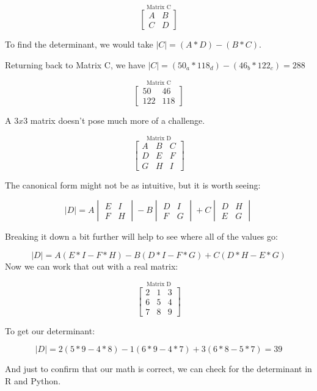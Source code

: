 \documentclass[
  letterpaper,
]{krantz}
\begin{document}
\[
\stackrel{\mbox{Matrix C}}{
\begin{bmatrix}
A & B\\
C & D
\end{bmatrix}
}
\]

To find the determinant, we would take \(\mid C \mid = (A*D) - (B*C)\).

Returning back to Matrix C, we have
\(\mid C \mid = (50_a*118_d) - (46_b*122_c) = 288\)

\[
\stackrel{\mbox{Matrix C}}{
\begin{bmatrix}
50 & 46\\
122 & 118
\end{bmatrix}
}
\]

A \(3x3\) matrix doesn't pose much more of a challenge.

\[
\stackrel{\mbox{Matrix D}}{
\begin{bmatrix}
A & B & C\\
D & E & F\\
G & H & I
\end{bmatrix}
}
\]

The canonical form might not be as intuitive, but it is worth seeing:

\[
\mid D \mid = A\begin{vmatrix}
E & I\\
F & H
\end{vmatrix}  - 
B\begin{vmatrix}
D & I\\
F & G
\end{vmatrix} + 
C\begin{vmatrix}
D & H\\
E & G
\end{vmatrix}
\]

Breaking it down a bit further will help to see where all of the values
go:

\[
\mid D \mid = A(E*I - F*H) - B(D*I - F*G) + C(D*H - E*G)
\] Now we can work that out with a real matrix:

\[
\stackrel{\mbox{Matrix D}}{
\begin{bmatrix}
2 & 1 & 3\\
6 & 5 & 4\\
7 & 8 & 9
\end{bmatrix}
}
\]

To get our determinant:

\[
\mid D \mid = 2(5*9 - 4*8) - 1(6*9 - 4*7) + 3(6*8 - 5*7) = 39
\]

And just to confirm that our math is correct, we can check for the
determinant in R and Python.
\end{document}
